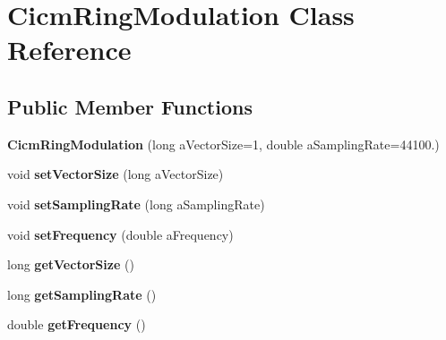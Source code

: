 \hypertarget{class_cicm_ring_modulation}{\section{Cicm\-Ring\-Modulation Class Reference}
\label{class_cicm_ring_modulation}
}
\subsection*{Public Member Functions}
\begin{DoxyCompactItemize}
\item 
\hypertarget{class_cicm_ring_modulation_a421451721b34a88a1df6e2e072556527}{{\bfseries Cicm\-Ring\-Modulation} (long a\-Vector\-Size=1, double a\-Sampling\-Rate=44100.)}\label{class_cicm_ring_modulation_a421451721b34a88a1df6e2e072556527}

\item 
\hypertarget{class_cicm_ring_modulation_a15390c47bc280fd0283e77d1cfc1b8cc}{void {\bfseries set\-Vector\-Size} (long a\-Vector\-Size)}\label{class_cicm_ring_modulation_a15390c47bc280fd0283e77d1cfc1b8cc}

\item 
\hypertarget{class_cicm_ring_modulation_ad4a4f349aebabf28e7b34679252c4dac}{void {\bfseries set\-Sampling\-Rate} (long a\-Sampling\-Rate)}\label{class_cicm_ring_modulation_ad4a4f349aebabf28e7b34679252c4dac}

\item 
\hypertarget{class_cicm_ring_modulation_ad90a8da25392efc63d7afd338acf41c9}{void {\bfseries set\-Frequency} (double a\-Frequency)}\label{class_cicm_ring_modulation_ad90a8da25392efc63d7afd338acf41c9}

\item 
\hypertarget{class_cicm_ring_modulation_a44bbcbf21be8c1988f1d75613f8a0467}{long {\bfseries get\-Vector\-Size} ()}\label{class_cicm_ring_modulation_a44bbcbf21be8c1988f1d75613f8a0467}

\item 
\hypertarget{class_cicm_ring_modulation_a2087da92c5111c19dd3f0959582e4b26}{long {\bfseries get\-Sampling\-Rate} ()}\label{class_cicm_ring_modulation_a2087da92c5111c19dd3f0959582e4b26}

\item 
\hypertarget{class_cicm_ring_modulation_a38eea5039c3402b3f140b71544cbdf60}{double {\bfseries get\-Frequency} ()}\label{class_cicm_ring_modulation_a38eea5039c3402b3f140b71544cbdf60}


\end{DoxyCompactItemize}
